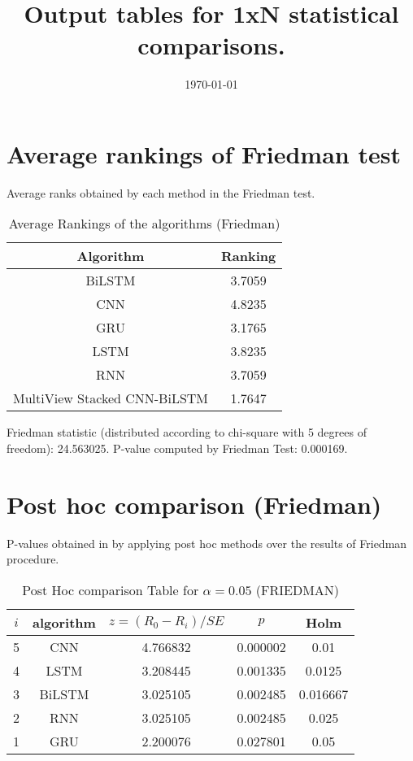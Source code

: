 \documentclass[a4paper,10pt]{article}
\title{Output tables for 1xN statistical comparisons.}
\author{}
\date{\today}
\begin{document}
\begin{landscape}
\pagestyle{empty}
\maketitle
\thispagestyle{empty}

\section{Average rankings of Friedman test}


Average ranks obtained by each method in the Friedman test.

\begin{table}[!htp]
\centering
\begin{tabular}{|c|c|}\hline
Algorithm&Ranking\\\hline
BiLSTM&3.7059\\CNN&4.8235\\GRU&3.1765\\LSTM&3.8235\\RNN&3.7059\\MultiView Stacked CNN-BiLSTM&1.7647\\\hline\end{tabular}
\caption{Average Rankings of the algorithms (Friedman)}
\end{table}

Friedman statistic (distributed according to chi-square with 5 degrees of freedom): 24.563025. \newline P-value computed by Friedman Test: 0.000169.\newline


\newpage

\section{Post hoc comparison (Friedman)}


P-values obtained in by applying post hoc methods over the results of Friedman procedure.

\begin{table}[!htp]
\centering\footnotesize
\begin{tabular}{ccccc}
$i$&algorithm&$z=(R_0 - R_i)/SE$&$p$&Holm \\
\hline5&CNN&4.766832&0.000002&0.01\\4&LSTM&3.208445&0.001335&0.0125\\3&BiLSTM&3.025105&0.002485&0.016667\\2&RNN&3.025105&0.002485&0.025\\1&GRU&2.200076&0.027801&0.05\\\hline
\end{tabular}
\caption{Post Hoc comparison Table for $\alpha=0.05$ (FRIEDMAN)}
\end{table}
\newpage


\end{landscape}
\end{document}
